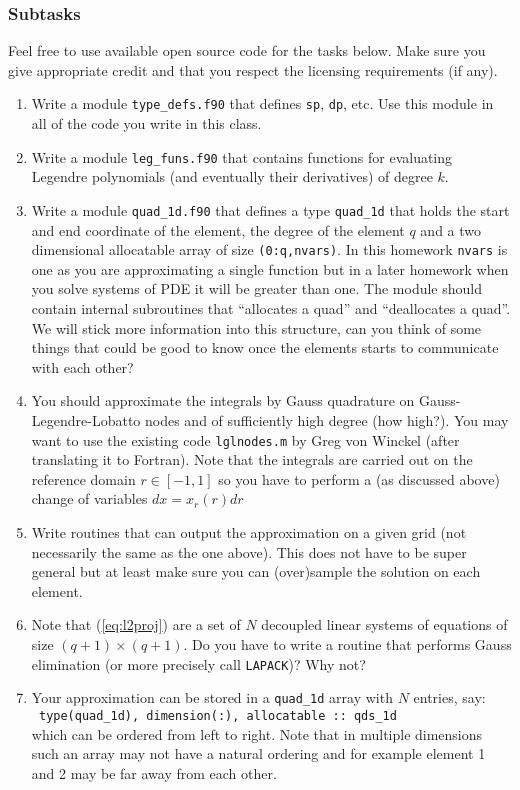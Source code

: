 \documentclass[12pt]{article}
\begin{document}
\subsubsection*{Subtasks}
Feel free to use available open source code for the tasks below. Make sure you give appropriate credit and that you respect the licensing requirements (if any).  
\begin{enumerate}
\item Write a module \verb+type_defs.f90+ that defines \verb+sp+,  \verb+dp+, etc. Use this module in all of the code you write in this class.
\item Write a module \verb+leg_funs.f90+ that contains functions for evaluating Legendre polynomials (and eventually their derivatives) of degree $k$. 
\item Write a module \verb+quad_1d.f90+ that defines a type \verb+quad_1d+ that holds the start and end coordinate of the element, the degree of the element $q$ and a two dimensional allocatable array of size \verb+(0:q,nvars)+. In this homework \verb+nvars+ is one as you are approximating a single function but in a later homework when you solve systems of PDE it will be greater than one. The module should contain internal subroutines that ``allocates a quad'' and ``deallocates a quad''. We will stick more information into this structure, can you think of some things that could be good to know once the elements starts to communicate with each other?       
\item You should approximate the integrals by Gauss quadrature on Gauss-Legendre-Lobatto nodes and of sufficiently high degree (how high?). You may want to use the existing code \verb+lglnodes.m+ by Greg von Winckel (after translating it to Fortran). Note that the integrals are carried out on the reference domain $r\in[-1,1]$ so you have to perform a (as discussed above) change of variables $dx = x_r(r) dr$
\item Write routines that can output the approximation on a given grid (not necessarily the same as the one above). This does not have to be super general but at least make sure you can (over)sample the solution on each element. 
\item Note that (\ref{eq:l2proj}) are a set of $N$ decoupled linear systems of equations of size $(q+1) \times (q+1)$. Do you have to write a routine that performs Gauss elimination (or more precisely call \verb+LAPACK+)? Why not?  
\item Your approximation can be stored in a \verb+quad_1d+ array with $N$ entries, say:\\
\verb+ type(quad_1d), dimension(:), allocatable :: qds_1d+ \\
which can be ordered from left to right. Note that in multiple dimensions such an array may not have a natural ordering and for example element 1 and 2 may be far away from each other.   
\end{enumerate}
\end{document}
